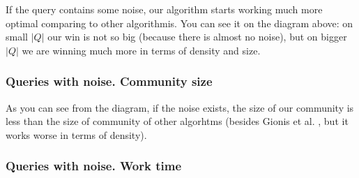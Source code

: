 If the query contains some noise, our algorithm starts working much more optimal comparing to other algorithmis. You can see it on the diagram above: on small $|Q|$ our win is not so big (because there is almost no noise), but on bigger $|Q|$ we are winning much more in terms of density and size.

\subsubsection{Queries with noise. Community size}

  \begin{center}
  \end{center}

As you can see from the diagram, if the noise exists, the size of our community is less than the size of community of other algorhtms (besides Gionis et al. \cite{Gionis15}, but it works worse in terms of density).

\subsubsection{Queries with noise. Work time}

